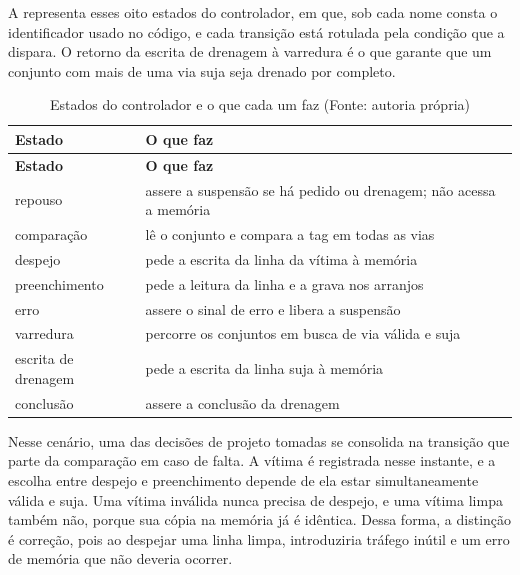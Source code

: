 A  representa esses oito estados do controlador, em que, sob cada nome consta o identificador usado no código, e cada transição está rotulada pela condição que a dispara. O retorno da escrita de drenagem à varredura é o que garante que um conjunto com mais de uma via suja seja drenado por completo.


{\small
\begin{longtable}{@{}>{\raggedright\arraybackslash}p{}>{\raggedright\arraybackslash}p{}@{}}
\caption[Estados do controlador e o que cada um faz]{Estados do controlador e o que cada um faz (Fonte: autoria própria)}\label{tab:3.9}\\
\hline
\textbf{Estado} & \textbf{O que faz} \\
\hline
\endfirsthead
\hline
\textbf{Estado} & \textbf{O que faz} \\
\hline
\endhead
\hline
\endlastfoot
repouso & assere a suspensão se há pedido ou drenagem; não acessa a memória \\
comparação & lê o conjunto e compara a tag em todas as vias \\
despejo & pede a escrita da linha da vítima à memória \\
preenchimento & pede a leitura da linha e a grava nos arranjos \\
erro & assere o sinal de erro e libera a suspensão \\
varredura & percorre os conjuntos em busca de via válida e suja \\
escrita de drenagem & pede a escrita da linha suja à memória \\
conclusão & assere a conclusão da drenagem \\
\end{longtable}
}

Nesse cenário, uma das decisões de projeto tomadas se consolida na transição que parte da comparação em caso de falta. A vítima é registrada nesse instante, e a escolha entre despejo e preenchimento depende de ela estar simultaneamente válida e suja. Uma vítima inválida nunca precisa de despejo, e uma vítima limpa também não, porque sua cópia na memória já é idêntica. Dessa forma, a distinção é correção, pois ao despejar uma linha limpa, introduziria tráfego inútil e um erro de memória que não deveria ocorrer.

